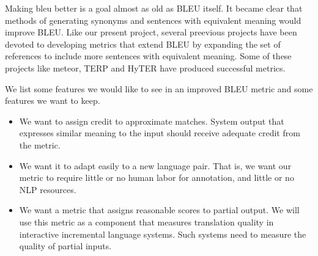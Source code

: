 

Making bleu better is a goal almost as old as BLEU itself. 
It became clear that  methods of generating synonyms and sentences with equivalent meaning would improve  BLEU. 
Like our present project, several preevious projects have been devoted to developing metrics that extend BLEU by expanding the set of references to include more sentences with equivalent meaning. 
Some of these projects like meteor\cite{banerjee-lavie:2005:MTSumm}\cite{denkowski:lavie:meteor-wmt:2014}, TERP\cite{snover-06}\cite{snover-08} and HyTER have produced successful metrics. 


We list some features we would like to see in an improved BLEU metric and some features we want to keep.  
\begin{itemize}
\item 
We want to assign credit to approximate matches. 
System output that expresses similar meaning to the input should receive adequate credit from the metric. 
\item 
We want  it to adapt easily to a new language pair. 
That is, we want our metric to require little or no human labor for annotation, and little or no NLP resources. 

\item 
We want a metric that assigns reasonable scores to partial output. 
We  will use this metric as a component that measures translation quality in interactive incremental language systems. 
Such systems need to measure the quality of partial inputs. 
\end{itemize}

